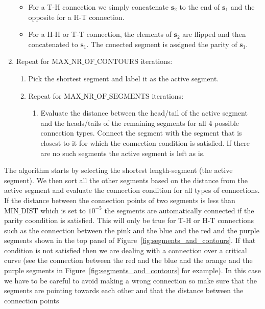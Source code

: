 \documentclass[12pt,dvipsnames]{report}
\begin{document}
\begin{enumerate}
    \begin{itemize}
        \item  For a T-H connection we simply concatenate $\mathbf{s}_2$ to the end of $\mathbf{s}_1$ 
        and the opposite for a H-T connection.
        \item For a H-H or T-T connection, the elements of $\mathbf{s}_2$ are flipped and then concatenated
        to $\mathbf{s}_1$. The conected segment is assigned the parity of $\mathbf{s}_1$.
    \end{itemize}
    \item Repeat for $\text{MAX\_NR\_OF\_CONTOURS}$ iterations:
    \begin{enumerate}
    \item Pick the shortest segment and label it as the active segment.
    \item Repeat for $\text{MAX\_NR\_OF\_SEGMENTS}$ iterations:
    \begin{enumerate}
    \item Evaluate the distance between the head/tail of the active segment and the 
    heads/tails of the remaining segments for all 4 possible connection types. 
    Connect the segment with the segment that is closest to it for which the connection 
    condition is satisfied.  If there are no such segments the active segment is left as is.
    \end{enumerate}
    \end{enumerate}
\end{enumerate}
The algorithm starts by selecting the shortest length-segment (the active segment). 
We then sort all the other segments based on the distance from the active segment and evaluate
the connection condition for all types of connections. If the distance between the connection
points of two segments is less than $\text{MIN\_DIST}$ which is set to $10^{-5}$ the segments
are automatically connected if the parity coondition is satisfied. This will only be true 
for T-H or H-T connections such as the connection between the pink and the blue and the red 
and the purple segments shown in the top panel of Figure~\ref{fig:segments_and_contours}.
If that condition is not satisfied then we are dealing with a connection over a critical curve 
(see the connection between the red and the blue and the orange and the purple segments 
in Figure~\ref{fig:segments_and_contours} for example).
In this case we have to be careful to avoid making a wrong connection so make sure that the 
segments are pointing towards each other and that the distance between the connection points 
\end{document}
